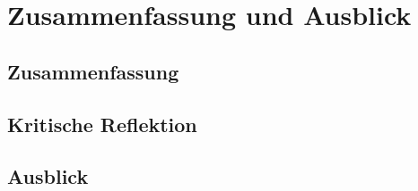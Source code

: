 \chapter{Zusammenfassung und Ausblick}
\label{chap:zusammenfassungUndAusblick}

\section{Zusammenfassung}
\label{sec:zusammenfassung}

\section{Kritische Reflektion}
\label{sec:kritischeRelfektion}

\section{Ausblick}
\label{sec:ausblick}
